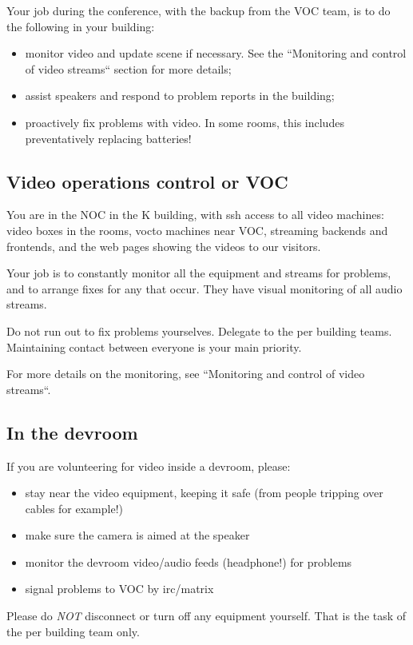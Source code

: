 \documentclass{article}
\begin{document}
Your job during the conference, with the backup from the VOC team, is to do the following in your building:
\begin{itemize}
  \item monitor video and update scene if necessary. See the ``Monitoring and control of video streams`` section for more details;
  \item assist speakers and respond to problem reports in the building;
  \item proactively fix problems with video. In some rooms, this includes preventatively replacing batteries!
\end{itemize}


\subsection{Video operations control or VOC}
You are in the NOC in the K building, with ssh access to all video machines: video boxes in the rooms, vocto machines near VOC, streaming backends and frontends, and the web pages showing the videos to our visitors.

Your job is to constantly monitor all the equipment and streams for problems, and to arrange fixes for any that occur. They have visual monitoring of all audio streams.

Do not run out to fix problems yourselves. Delegate to the per building teams. Maintaining contact between everyone is your main priority.

For more details on the monitoring, see ``Monitoring and control of video streams``. 


\subsection{In the devroom}
If you are volunteering for video inside a devroom, please:
\begin{itemize}
  \item stay near the video equipment, keeping it safe (from people tripping over cables for example!)
  \item make sure the camera is aimed at the speaker
  \item monitor the devroom video/audio feeds (headphone!) for problems
  \item signal problems to VOC by irc/matrix
\end{itemize}

Please do \emph{NOT} disconnect or turn off any equipment yourself. That is the task of the per building team only.
\end{document}
